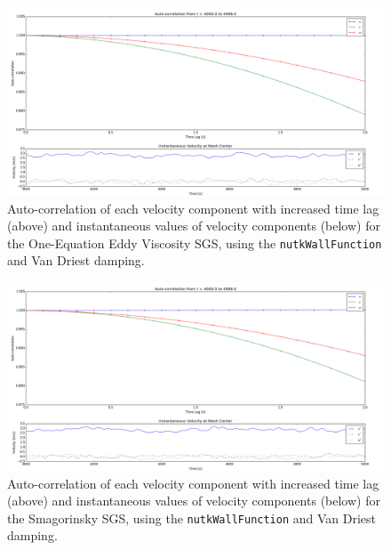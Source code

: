 \documentclass[12pt]{article}
\begin{document}
\begin{figure}[H]
\centering
\includegraphics[scale=0.35]{vd_nutk/keq_stability.png}
\caption{Auto-correlation of each velocity component with increased time lag (above) and instantaneous values of velocity components (below) for the One-Equation Eddy Viscosity SGS, using the \texttt{nutkWallFunction} and Van Driest damping.}
\label{vd_nutk_keq_stab}
\end{figure}
  
\begin{figure}[H]
\centering
\includegraphics[scale=0.35]{vd_nutk/sm_stability.png}
\caption{Auto-correlation of each velocity component with increased time lag (above) and instantaneous values of velocity components (below) for the Smagorinsky SGS, using the \texttt{nutkWallFunction} and Van Driest damping.}
\label{vd_nutk_sm_stab}
\end{figure}
\end{document}
